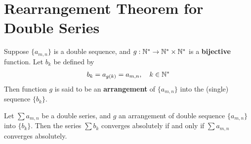 \documentclass[thmcnt=section, 12pt]{my-elegantbook}
\begin{document}

\section{Rearrangement Theorem for Double Series}

\begin{definition}
    Suppose $\{a_{m,n}\}$ is a double sequence, and $g: \mathbb{N}^\ast \to \mathbb{N}^\ast \times \mathbb{N}^\ast$ is a \textbf{bijective} function. Let $b_k$ be defined by
    \begin{align*}
        b_k = a_{g(k)} = a_{m, n},
        \quad k \in \mathbb{N}^\ast
    \end{align*}
    Then function $g$ is said to be an \textbf{arrangement} of $\{a_{m,n}\}$ into the (single) sequence $\{b_k\}$.
\end{definition}


\begin{lemma} \label{lem:4}
    Let $\sum a_{m,n}$ be a double series, and $g$ an arrangement of double sequence $\{a_{m,n}\}$ into $\{b_k\}$. Then the series $\sum b_k$ converges absolutely if and only if $\sum a_{m,n}$ converges absolutely.
\end{lemma}
\end{document}
